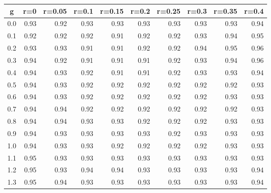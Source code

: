 %
\begin{table}[!tbp]
 \begin{center}
 \begin{tabular}{rrrrrrrrrr}\hline\hline
\multicolumn{1}{c}{g}&\multicolumn{1}{c}{r=0}&\multicolumn{1}{c}{r=0.05}&\multicolumn{1}{c}{r=0.1}&\multicolumn{1}{c}{r=0.15}&\multicolumn{1}{c}{r=0.2}&\multicolumn{1}{c}{r=0.25}&\multicolumn{1}{c}{r=0.3}&\multicolumn{1}{c}{r=0.35}&\multicolumn{1}{c}{r=0.4}\tabularnewline
\hline
0.0&0.93&0.92&0.93&0.93&0.93&0.93&0.93&0.93&0.94\tabularnewline
0.1&0.92&0.92&0.92&0.91&0.92&0.92&0.93&0.94&0.95\tabularnewline
0.2&0.93&0.93&0.91&0.91&0.92&0.92&0.94&0.95&0.96\tabularnewline
0.3&0.94&0.92&0.91&0.91&0.91&0.92&0.93&0.94&0.96\tabularnewline
0.4&0.94&0.93&0.92&0.91&0.91&0.92&0.93&0.93&0.94\tabularnewline
0.5&0.94&0.93&0.92&0.92&0.92&0.92&0.92&0.92&0.93\tabularnewline
0.6&0.94&0.93&0.92&0.92&0.92&0.92&0.92&0.93&0.93\tabularnewline
0.7&0.94&0.94&0.92&0.92&0.92&0.92&0.92&0.92&0.93\tabularnewline
0.8&0.94&0.94&0.93&0.93&0.92&0.92&0.92&0.93&0.93\tabularnewline
0.9&0.94&0.93&0.93&0.93&0.93&0.92&0.93&0.93&0.93\tabularnewline
1.0&0.94&0.93&0.93&0.92&0.92&0.92&0.92&0.93&0.93\tabularnewline
1.1&0.95&0.93&0.93&0.93&0.93&0.93&0.93&0.93&0.93\tabularnewline
1.2&0.95&0.93&0.94&0.94&0.93&0.93&0.93&0.93&0.94\tabularnewline
1.3&0.95&0.94&0.93&0.93&0.93&0.93&0.93&0.93&0.94\tabularnewline
\hline
\end{tabular}

\end{center}

\end{table}

